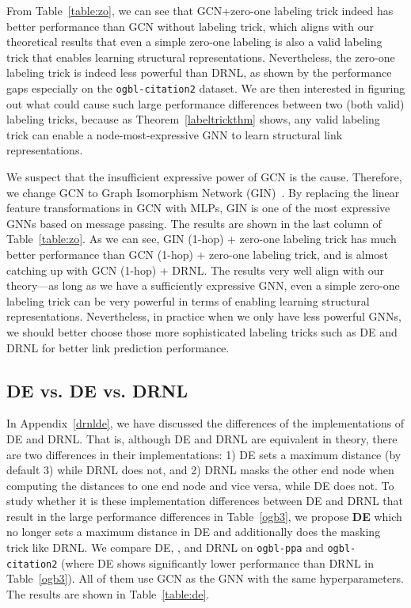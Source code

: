 \documentclass{article}
\begin{document}
From Table~\ref{table:zo}, we can see that GCN+zero-one labeling trick indeed  has better performance than GCN without labeling trick, which aligns with our theoretical results that even a simple zero-one labeling is also a valid labeling trick that enables learning structural representations. Nevertheless, the zero-one labeling trick is indeed less powerful than DRNL, as shown by the performance gaps especially on the \texttt{ogbl-citation2} dataset. We are then interested in figuring out what could cause such large performance differences between two (both valid) labeling tricks, because as Theorem~\ref{labeltrickthm} shows, any valid labeling trick can enable a node-most-expressive GNN to learn structural link representations.

We suspect that the insufficient expressive power of GCN is the cause. Therefore, we change GCN to Graph Isomorphism Network (GIN)~\citep{xu2018powerful}. By replacing the linear feature transformations in GCN with MLPs, GIN is one of the most expressive GNNs based on message passing. The results are shown in the last column of Table~\ref{table:zo}. As we can see, GIN (1-hop) + zero-one labeling trick has much better performance than GCN (1-hop) + zero-one labeling trick, and is almost catching up with GCN (1-hop) + DRNL. The results very well align with our theory---as long as we have a sufficiently expressive GNN, even a simple zero-one labeling trick can be very powerful in terms of enabling learning structural representations. Nevertheless, in practice when we only have less powerful GNNs, we should better choose those more sophisticated labeling tricks such as DE and DRNL for better link prediction performance.


\subsection{DE vs. \textbf{DE} vs. DRNL}\label{ablation:de}
In Appendix~\ref{drnlde}, we have discussed the differences of the implementations of DE and DRNL. That is, although DE and DRNL are equivalent in theory, there are two differences in their implementations: 1) DE sets a maximum distance  (by default 3) while DRNL does not, and 2) DRNL masks the other end node when computing the distances to one end node and vice versa, while DE does not. To study whether it is these implementation differences between DE and DRNL that result in the large performance differences in Table~\ref{ogb3}, we propose \textbf{DE} which no longer sets a maximum distance in DE and additionally does the masking trick like DRNL. We compare DE, , and DRNL on \texttt{ogbl-ppa} and \texttt{ogbl-citation2} (where DE shows significantly lower performance than DRNL in Table~\ref{ogb3}). All of them use GCN as the GNN with the same hyperparameters. The results are shown in Table~\ref{table:de}.
\end{document}
